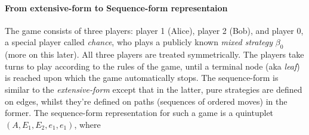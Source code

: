 \documentclass{article} %
\begin{document}

\paragraph{From extensive-form to Sequence-form representaion}
The game consists of three players: player 1 (Alice), player 2 (Bob), and player 0, a special player called \textit{chance}, who plays a publicly known \textit{mixed strategy} $\beta_0$ (more on this later). All three players are treated symmetrically.
The players take turns to play according to the rules of the game, until a terminal node (aka \textit{leaf}) is reached upon which the game automatically stops. The sequence-form is similar to the \textit{extensive-form} except that in the latter, pure strategies are defined on edges, whilst they're defined on paths (sequences of ordered moves) in the former.
The sequence-form representation for such a game is a quintuplet $(A, E_1, E_2, e_1, e_1)$, where
\end{document}
